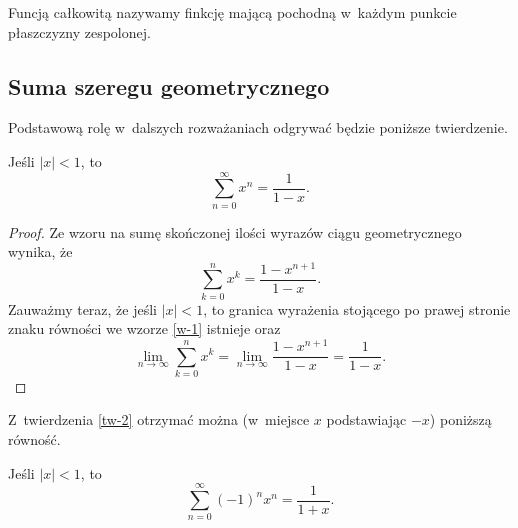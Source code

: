 \begin{definicja}
  Funcją całkowitą nazywamy finkcję mającą pochodną w~każdym punkcie
  płaszczyzny zespolonej.
\end{definicja}

\subsection{Suma szeregu geometrycznego}

\noindent Podstawową rolę w~dalszych rozważaniach odgrywać będzie
poniższe twierdzenie.

\begin{theorem}\label{tw-2}
  Jeśli $|x|<1$, to
  \begin{equation*}
    \sum_{n=0}^\infty x^n=\frac{1}{1-x}.
  \end{equation*}
\end{theorem}

\begin{proof}
  Ze wzoru na sumę skończonej ilości wyrazów ciągu geometrycznego
  wynika, że
  \begin{equation}\label{w-1}
    \sum_{k=0}^n x^k=\frac{1-x^{n+1}}{1-x}.
  \end{equation}
  Zauważmy teraz, że jeśli $|x|<1$, to granica wyrażenia stojącego po
  prawej stronie znaku równości we wzorze \eqref{w-1} istnieje oraz
  \[
  \lim_{n\to\infty} \sum_{k=0}^n x^k=\lim_{n\to\infty}
  \frac{1-x^{n+1}}{1-x} =\frac{1}{1-x}.
  \]
\end{proof}

Z~twierdzenia \ref{tw-2} otrzymać można (w~miejsce $x$ podstawiając
$-x$) poniższą równość.

\begin{wniosek}
Jeśli $|x|<1$, to 
\begin{equation}\label{w-2}
\sum_{n=0}^\infty (-1)^n x^n=\frac{1}{1+x}.
\end{equation}
\end{wniosek}

\lipsum[1-5]

